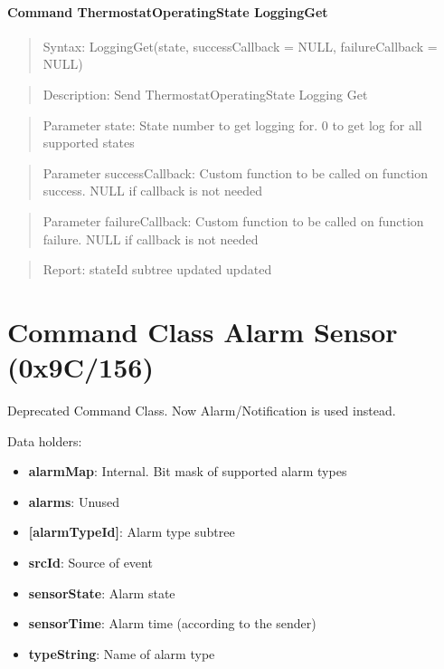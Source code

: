 \paragraph{Command ThermostatOperatingState LoggingGet}
\begin{quote}Syntax: LoggingGet(state, successCallback = NULL, failureCallback = NULL)\end{quote}
\begin{quote}Description: Send ThermostatOperatingState Logging Get\end{quote}
\begin{quote}Parameter state: State number to get logging for. 0 to get log for all supported states\end{quote}
\begin{quote}Parameter successCallback: Custom function to be called on function success. NULL if callback is not needed\end{quote}
\begin{quote}Parameter failureCallback: Custom function to be called on function failure. NULL if callback is not needed\end{quote}
\begin{quote}Report: stateId subtree updated updated\end{quote}


\section{Command Class Alarm Sensor (0x9C/156)}

Deprecated Command Class. Now Alarm/Notification is used instead.
\newline

\noindent
Data holders:

\begin{itemize}
\item \textbf{alarmMap}: Internal. Bit mask of supported alarm types
\item \textbf{alarms}: Unused
\item \textbf{[alarmTypeId]}: Alarm type subtree
\item \qquad\textbf{srcId}: Source of event
\item \qquad\textbf{sensorState}: Alarm state
\item \qquad\textbf{sensorTime}: Alarm time (according to the sender)
\item \qquad\textbf{typeString}: Name of alarm type
\end{itemize}

